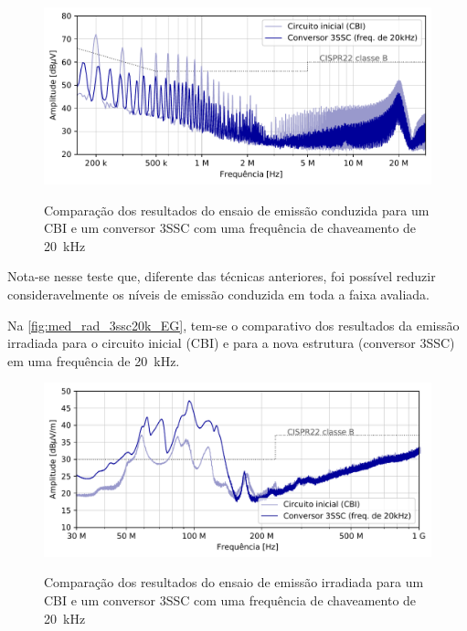     \begin{figure}[H]
    	\centering
    	\caption{Comparação dos resultados do ensaio de emissão conduzida para um CBI e um conversor 3SSC com uma frequência de chaveamento de \SI{20}{\kilo\hertz}}
    	\includegraphics[scale=.9]{pdf/cond/Conversor 3SSC (freq. de 20kHz).pdf}
    	\label{fig:med_cond_3ssc20k_EG}
    \end{figure}
    
    Nota-se nesse teste que, diferente das técnicas anteriores, foi possível reduzir consideravelmente os níveis de emissão conduzida em toda a faixa avaliada. 
    
    Na \autoref{fig:med_rad_3ssc20k_EG}, tem-se o comparativo dos resultados da emissão irradiada para o circuito inicial (CBI) e para a nova estrutura (conversor 3SSC) em uma frequência de \SI{20}{\kilo\hertz}.
    
    \begin{figure}[H]
    	\centering
    	\caption{Comparação dos resultados do ensaio de emissão irradiada para um CBI e um conversor 3SSC com uma frequência de chaveamento de \SI{20}{\kilo\hertz}}
    	\includegraphics[scale=.9]{pdf/rad/Conversor 3SSC (freq. de 20kHz).pdf}
    	\label{fig:med_rad_3ssc20k_EG}
    \end{figure}
    
